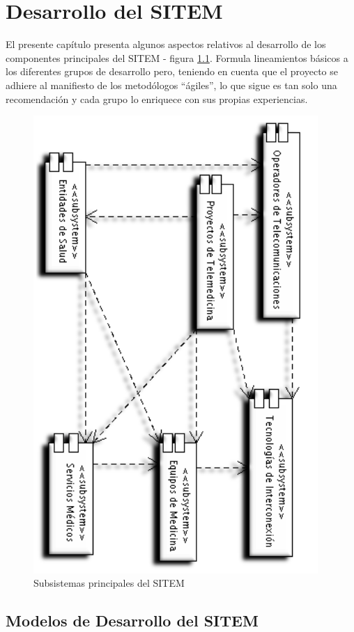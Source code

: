 \chapter{Desarrollo del SITEM}

El presente capítulo presenta algunos aspectos relativos al desarrollo de los componentes principales del SITEM - figura \ref{arquitectura_sitem}. Formula lineamientos básicos a los diferentes grupos de desarrollo pero, teniendo en cuenta que el proyecto se adhiere al manifiesto de los metodólogos “ágiles”, lo que sigue es tan solo una recomendación y cada grupo lo enriquece con sus propias experiencias. 

\begin{figure}
 \centering
 \includegraphics[width=108mm, height=174mm]{ArquitecturaGeneral.png}
 \caption{Subsistemas principales del SITEM}
 \label{arquitectura_sitem}
\end{figure}
\section{Modelos de Desarrollo del SITEM}

